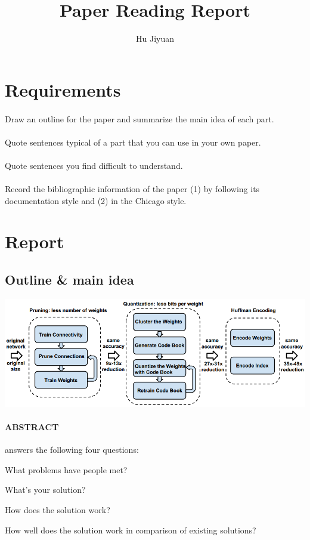 \documentclass{article}
\author{Hu Jiyuan}
\title{Paper Reading Report}
\begin{document}
\maketitle
\section{Requirements}

\paragraph{} Draw an outline for the paper and summarize the main idea of each part.
\paragraph{} Quote sentences typical of a part that you can use in your own paper.
\paragraph{} Quote sentences you find difficult to understand.
\paragraph{} Record the bibliographic information of the paper 
(1) by following its documentation style and 
(2) in the Chicago style.

\section{Report}
\subsection{Outline \& main idea}
\includegraphics[width=\textwidth]{graphics/part1-overview.png}  
\paragraph{ABSTRACT} answers the following four questions: 
    \par What problems have people met?
    \par What's your solution?
    \par How does the solution work?
    \par How well does the solution work in comparison of existing solutions?
\end{document}
